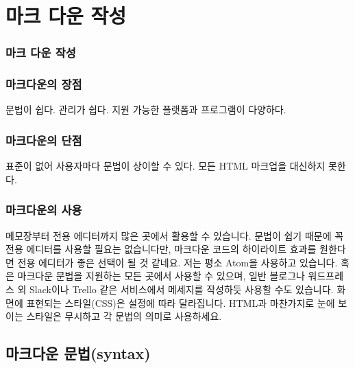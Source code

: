 \documentclass[12pt, a4paper, oneside]{book}
\let\stdsection\section
\renewcommand\section{\newpage\stdsection}
\begin{document}
	\part 	{마크 다운 작성 }
	\noptcrule
	\parttoc				

			
				\section{마크 다운 작성}
			
			
				\section{마크다운의 장점}
				문법이 쉽다.
				관리가 쉽다.
				지원 가능한 플랫폼과 프로그램이 다양하다.
			
				\section{마크다운의 단점}
				표준이 없어 사용자마다 문법이 상이할 수 있다.
				모든 HTML 마크업을 대신하지 못한다.
			
				\section{마크다운의 사용}
			
				메모장부터 전용 에디터까지 많은 곳에서 활용할 수 있습니다.
				문법이 쉽기 때문에 꼭 전용 에디터를 사용할 필요는 없습니다만, 마크다운 코드의 하이라이트 효과를 원한다면 전용 에디터가 좋은 선택이 될 것 같네요.
				저는 평소 Atom을 사용하고 있습니다.
				혹은 마크다운 문법을 지원하는 모든 곳에서 사용할 수 있으며, 일반 블로그나 워드프레스 외 Slack이나 Trello 같은 서비스에서 메세지를 작성하듯 사용할 수도 있습니다.
				화면에 표현되는 스타일(CSS)은 설정에 따라 달라집니다.
				HTML과 마찬가지로 눈에 보이는 스타일은 무시하고 각 문법의 의미로 사용하세요.
				

				\chapter 	{마크다운 문법(syntax)}
				\minitoc 
			
\end{document}
